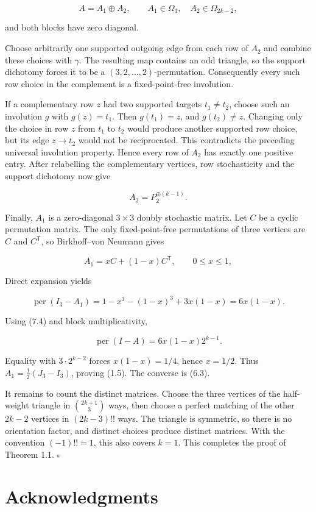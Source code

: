 \documentclass[11pt]{article}
\theoremstyle{remark}
\begin{document}
\[
A=A_1\oplus A_2,
\qquad A_1\in\Omega_3,\quad A_2\in\Omega_{2k-2},
\tag{7.3}
\]

and both blocks have zero diagonal.

Choose arbitrarily one supported outgoing edge from each row of $A_2$ and
combine these choices with $\gamma$. The resulting map contains an odd
triangle, so the support dichotomy forces it to be a
$(3,2,\ldots,2)$-permutation. Consequently every such row choice in the
complement is a fixed-point-free involution.

If a complementary row $z$ had two supported targets $t_1\ne t_2$, choose
such an involution $g$ with $g(z)=t_1$. Then $g(t_1)=z$, and
$g(t_2)\ne z$. Changing only the choice in row $z$ from $t_1$ to $t_2$
would produce another supported row choice, but its edge $z\to t_2$ would
not be reciprocated. This contradicts the preceding universal involution
property. Hence every row of $A_2$ has exactly one positive entry. After
relabelling the complementary vertices, row stochasticity and the support
dichotomy now give

\[
A_2=P_2^{\oplus(k-1)}.
\tag{7.4}
\]

Finally, $A_1$ is a zero-diagonal $3\times3$ doubly stochastic matrix. Let
$C$ be a cyclic permutation matrix. The only fixed-point-free permutations
of three vertices are $C$ and $C^{\mathsf T}$, so Birkhoff--von Neumann gives

\[
A_1=xC+(1-x)C^{\mathsf T},
\qquad 0\le x\le1,
\tag{7.5}
\]

Direct expansion yields

\[
\operatorname{per}(I_3-A_1)
=1-x^3-(1-x)^3+3x(1-x)
=6x(1-x).
\tag{7.6}
\]

Using (7.4) and block multiplicativity,

\[
\operatorname{per}(I-A)=6x(1-x)2^{k-1}.
\tag{7.7}
\]

Equality with $3\cdot2^{k-2}$ forces $x(1-x)=1/4$, hence $x=1/2$.
Thus $A_1=\tfrac12(J_3-I_3)$, proving (1.5). The converse is (6.3).

It remains to count the distinct matrices. Choose the three vertices of the
half-weight triangle in $\binom{2k+1}{3}$ ways, then choose a perfect
matching of the other $2k-2$ vertices in $(2k-3)!!$ ways. The triangle is
symmetric, so there is no orientation factor, and distinct choices produce
distinct matrices. With the convention $(-1)!!=1$, this also covers
$k=1$. This completes the proof of Theorem 1.1. \hfill\(\square\)

\section*{Acknowledgments}
\end{document}
